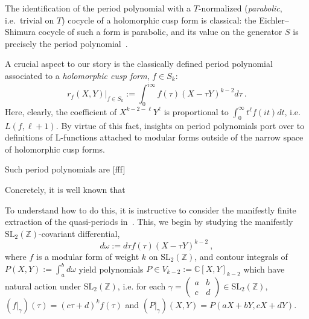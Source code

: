 \documentclass[11pt]{article}
\numberwithin{equation}{section}  %
\newcommand{\ZZ}{\mathbb{Z}}
\newcommand{\CC}{\mathbb{C}}
\newcommand{\SLZ}{\mathrm{SL}_2(\ZZ)}
\begin{document}
The identification of the period polynomial with a $T$-normalized (\emph{parabolic}, i.e.\ trivial on $T$) cocycle of a holomorphic cusp form is classical: the Eichler--Shimura cocycle of such a form is parabolic, and its value on the generator $S$ is precisely the period polynomial~\cite{KZ1984, BCD2018}.

\pagebreak

A crucial aspect to our story is the classically defined period polynomial associated to 
a \emph{holomorphic cusp form}, $f \in S_k$:
\begin{equation}
r_f(X, Y)\bigg|_{f \in S_k} := \int_0^{i \infty} f(\tau) (X - \tau Y)^{k-2} d\tau ~.
\end{equation}
Here, clearly, the coefficient of $X^{k-2-\ell} Y^{\ell}$ is proportional to $\int_0^\infty t^{\ell} f(it) dt$,
i.e. $L(f,\ell+1)$. By virtue of this fact, insights on period polynomials port over to definitions of 
L-functions attached to modular forms outside of the narrow space of holomorphic cusp forms.

Such period polynomials are [fff]

Concretely, it is well known that 

\pagebreak

To understand how to do this, it is instructive to consider the manifestly finite extraction 
of the quasi-periods in~\cite{Brown2017}. This, we begin by studying the manifestly 
$\SLZ$-covariant differential,
\begin{equation}
d\omega := d\tau f(\tau) (X - \tau Y)^{k-2}~,
\end{equation}
where $f$ is a modular form of weight $k$ on $\SLZ$, and contour integrals of 
$P(X, Y) := \int_a^b d\omega$ yield polynomials $P \in V_{k-2} := \CC[X, Y]_{k-2}$ 
which have natural action under $\SLZ$, i.e. for each $\gamma = \left( 
\begin{smallmatrix} a & b \\ c & d \end{smallmatrix} \right) \in \SLZ$, 
$(f|_\gamma)(\tau) = (c\tau + d)^k f(\tau)$ and $(P|_\gamma)(X, Y) = 
P(a X + b Y, c X + d Y)$.
\end{document}
